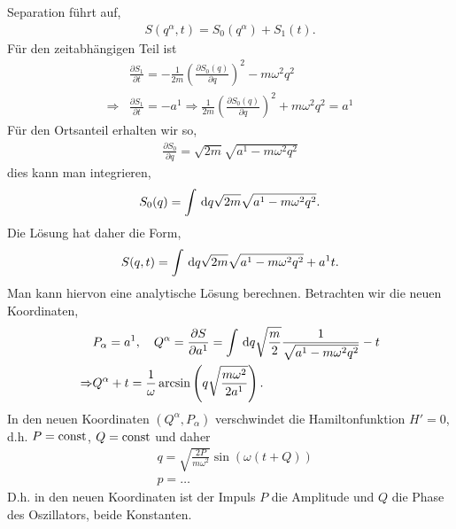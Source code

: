 \begin{bsp}
Separation führt auf,
\begin{align*}
S(q^\alpha,t) = S_0(q^\alpha) + S_1(t).
\end{align*}
Für den zeitabhängigen Teil ist
\begin{align*}
&\frac{\partial S_1}{\partial t} =
-\frac{1}{2m}\left(\frac{\partial S_0(q)}{\partial q} \right)^2 - m\omega^2
q^2\\
\Rightarrow &
\frac{\partial S_1}{\partial t} = -a^1 
\Rightarrow  
\frac{1}{2m}\left(\frac{\partial S_0(q)}{\partial q} \right)^2 + m\omega^2 q^2
= a^1
\end{align*}
Für den Ortsanteil erhalten wir so,
\begin{align*}
\frac{\partial S_0}{\partial q} = \sqrt{2m}\sqrt{a^1 -m\omega^2 q^2}
\end{align*}
dies kann man integrieren,
\begin{align*}
S_0(q) = \int \,\mathrm{d} q \sqrt{2m}\sqrt{a^1 - m\omega^2 q^2}. 
\end{align*}
Die Lösung hat daher die Form,
\begin{align*}
S(q,t) = \int \,\mathrm{d} q \sqrt{2m}\sqrt{a^1 - m\omega^2 q^2} + a^1 t.
\end{align*}
Man kann hiervon eine analytische Lösung berechnen. Betrachten wir die neuen
Koordinaten,
\begin{align*}
&P_\alpha = a^1,\quad Q^\alpha = \frac{\partial S}{\partial a^1}
= \int\,\mathrm{d} q \sqrt{\frac{m}{2}} \frac{1}{\sqrt{a^1 - m\omega^2 q^2}} - t\\
\Rightarrow &
Q^\alpha + t =
\frac{1}{\omega}\arcsin\left(q\sqrt{\frac{m\omega^2}{2a^1}}\right).
\end{align*}
In den neuen Koordinaten $(Q^\alpha,P_\alpha)$ verschwindet die
Hamiltonfunktion $H'=0$, d.h. $P=\mathrm{const}$, $Q=\mathrm{const}$ und daher
\begin{align*}
&q = \sqrt{\frac{2P}{m\omega^2}}\sin\left(\omega(t+Q) \right)\\
&p = \ldots
\end{align*}
D.h. in den neuen Koordinaten ist der Impuls $P$ die Amplitude und $Q$ die
Phase des Oszillators, beide Konstanten.\bsphere
\end{bsp}